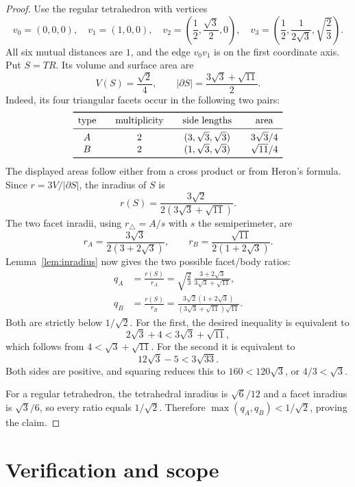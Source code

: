 \documentclass[11pt]{article}
\begin{document}
\begin{proof}
Use the regular tetrahedron with vertices
\[
 v_0=(0,0,0),\quad v_1=(1,0,0),\quad
 v_2=\left(\frac12,\frac{\sqrt3}{2},0\right),\quad
 v_3=\left(\frac12,\frac{1}{2\sqrt3},\sqrt{\frac23}\right).
\]
All six mutual distances are $1$, and the edge $v_0v_1$ is on the first
coordinate axis.  Put $S=TR$.  Its volume and surface area are
\[
 V(S)=\frac{\sqrt2}{4},\qquad
 \lvert\partial S\rvert=\frac{3\sqrt3+\sqrt{11}}{2}.
\]
Indeed, its four triangular facets occur in the following two pairs:
\[
\begin{array}{c@{\qquad}c@{\qquad}c@{\qquad}c}
\toprule
\text{type}&\text{multiplicity}&\text{side lengths}&\text{area}\\
\midrule
A&2&(3,\sqrt3,\sqrt3)&3\sqrt3/4\\
B&2&(1,\sqrt3,\sqrt3)&\sqrt{11}/4\\
\bottomrule
\end{array}
\]
The displayed areas follow either from a cross product or from Heron's
formula.  Since $r=3V/\lvert\partial S\rvert$, the inradius of $S$ is
\[
 r(S)=\frac{3\sqrt2}{2(3\sqrt3+\sqrt{11})}.
\]
The two facet inradii, using $r_{\triangle}=A/s$ with $s$ the
semiperimeter, are
\[
 r_A=\frac{3\sqrt3}{2(3+2\sqrt3)},\qquad
 r_B=\frac{\sqrt{11}}{2(1+2\sqrt3)}.
\]
Lemma~\ref{lem:inradius} now gives the two possible facet/body ratios:
\begin{align*}
 q_A&=\frac{r(S)}{r_A}
 =\sqrt{\frac23}\,
   \frac{3+2\sqrt3}{3\sqrt3+\sqrt{11}},\\
 q_B&=\frac{r(S)}{r_B}
 =\frac{3\sqrt2(1+2\sqrt3)}
        {(3\sqrt3+\sqrt{11})\sqrt{11}}.
\end{align*}
Both are strictly below $1/\sqrt{2}$.  For the first, the desired inequality
is equivalent to
\[
 2\sqrt3+4<3\sqrt3+\sqrt{11},
\]
which follows from $4<\sqrt3+\sqrt{11}$.  For the second it is equivalent to
\[
 12\sqrt3-5<3\sqrt{33}.
\]
Both sides are positive, and squaring reduces this to
$160<120\sqrt3$, or $4/3<\sqrt3$.

For a regular tetrahedron, the tetrahedral inradius is $\sqrt6/12$ and a
facet inradius is $\sqrt3/6$, so every ratio equals $1/\sqrt2$.  Therefore
$\max(q_A,q_B)<1/\sqrt2$, proving the claim.
\end{proof}

\section{Verification and scope}
\end{document}
